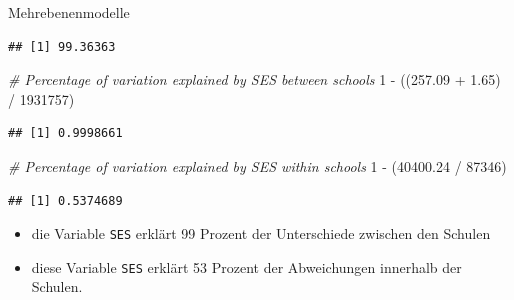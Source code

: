 \documentclass[ignorenonframetext,]{beamer}
\newenvironment{Shaded}{}{}
\newcommand{\DecValTok}[1]{\textcolor[rgb]{0.25,0.63,0.44}{{#1}}}
\newcommand{\FloatTok}[1]{\textcolor[rgb]{0.25,0.63,0.44}{{#1}}}
\newcommand{\StringTok}[1]{\textcolor[rgb]{0.25,0.44,0.63}{{#1}}}
\newcommand{\CommentTok}[1]{\textcolor[rgb]{0.38,0.63,0.69}{\textit{{#1}}}}
\newcommand{\NormalTok}[1]{{#1}}
\providecommand{\tightlist}{%
\setlength{\itemsep}{0pt}\setlength{\parskip}{0pt}}
\begin{document}
\begin{frame}[fragile]{Mehrebenenmodelle}
\begin{block}{}

\begin{Shaded}
\end{Shaded}

\begin{verbatim}
## [1] 99.36363
\end{verbatim}

\begin{Shaded}
\begin{Highlighting}[]
\CommentTok{# Percentage of variation explained by SES between schools}
\DecValTok{1} \NormalTok{-}\StringTok{ }\NormalTok{((}\FloatTok{257.09} \NormalTok{+}\StringTok{ }\FloatTok{1.65}\NormalTok{) /}\StringTok{ }\DecValTok{1931757}\NormalTok{)}
\end{Highlighting}
\end{Shaded}

\begin{verbatim}
## [1] 0.9998661
\end{verbatim}

\begin{Shaded}
\begin{Highlighting}[]
\CommentTok{# Percentage of variation explained by SES within schools}
\DecValTok{1} \NormalTok{-}\StringTok{ }\NormalTok{(}\FloatTok{40400.24} \NormalTok{/}\StringTok{ }\DecValTok{87346}\NormalTok{)}
\end{Highlighting}
\end{Shaded}

\begin{verbatim}
## [1] 0.5374689
\end{verbatim}

\begin{itemize}
\tightlist
\item
  die Variable \texttt{SES} erklärt 99 Prozent der Unterschiede zwischen
  den Schulen
\item
  diese Variable \texttt{SES} erklärt 53 Prozent der Abweichungen
  innerhalb der Schulen.
\end{itemize}

\end{block}


\end{frame}
\end{document}
